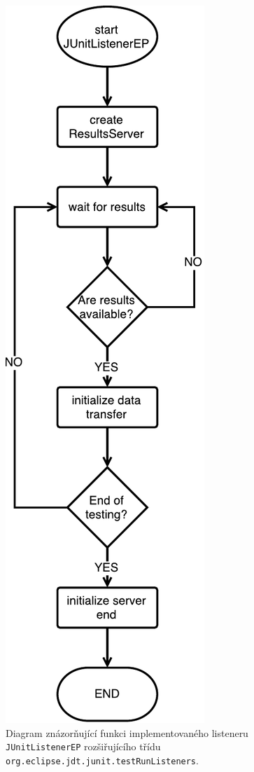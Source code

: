 	\begin{figure}
	  \includegraphics[width=\textwidth, height=0.8\textheight, keepaspectratio, center]{obrazky-figures/inrunjunit_listener_flowchart.pdf}
	  \caption{Diagram znázorňující funkci implementovaného listeneru \texttt{JUnitListenerEP} rozšiřujícího třídu \texttt{org.eclipse.jdt.junit.testRunListeners}.}
	  \label{fig:listener_flowchart}
	\end{figure}

